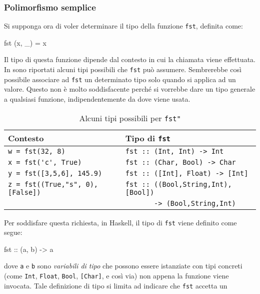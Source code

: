 \subsubsection{Polimorfismo 
semplice}

Si supponga ora di voler determinare il tipo della funzione \verb"fst", 
definita come:
\begin{haskellCode}
fst (x, _) = x
\end{haskellCode}
%
Il tipo di questa funzione dipende dal contesto in cui la chiamata viene 
effettuata. In  sono riportati 
alcuni tipi possibili che \verb"fst" pu\`o assumere. Sembrerebbe 
cos\`i possibile associare ad \verb"fst" un determinato tipo solo 
quando si applica ad un valore. Questo non \`e molto 
soddisfacente perch\'e si vorrebbe dare un tipo generale a qualsiasi 
funzione, indipendentemente da dove viene usata.
\begin{table}[htb]
    \begin{center}
        \begin{tabular}{|l l|}
            \hline
            Contesto & Tipo di \verb"fst"\\
            \hline
            \verb"w = fst(32, 8)" & \verb"fst :: (Int, Int) -> Int" \\
            \verb"x = fst('c', True)" & \verb"fst :: (Char, Bool) -> Char" \\
            \verb"y = fst([3,5,6], 145.9)" & \verb"fst :: ([Int], Float) -> [Int]" \\
            \verb+z = fst((True,"s", 0),[False])+ & 
            \verb"fst :: ((Bool,String,Int), [Bool])" \\
            & \verb"       -> (Bool,String,Int)" \\
            \hline
        \end{tabular}
        \caption{Alcuni tipi possibili per \texttt{fst"}}
	\label{tab:funprog-polimorfismosemplice}
    \end{center}
\end{table}
%
Per soddisfare questa richiesta, in Haskell, il tipo di \verb"fst" viene definito come segue:
\begin{haskellCode}
fst :: (a, b) -> a
\end{haskellCode}
%
dove \verb"a" e \verb"b" sono \emph{variabili di tipo} che possono essere 
istanziate con tipi concreti (come \verb"Int", \verb"Float", \verb"Bool", 
\verb"[Char]", e cos\`i via) non appena la funzione viene invocata. 
Tale definizione di tipo si limita ad indicare che \verb"fst" accetta un 
